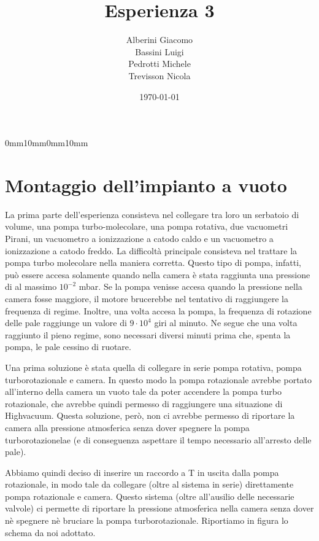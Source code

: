 \documentclass[11pt]{article}
\begin{document}
\title{\textbf{Esperienza 3}}
\author{Alberini Giacomo\\ Bassini Luigi\\Pedrotti Michele\\ Trevisson Nicola}
\date{\today}
\setmarginsrb{30mm}{10mm}{25mm}{10mm}%
             {0mm}{10mm}{0mm}{10mm}
\maketitle

\section{Montaggio dell'impianto a vuoto}
La prima parte dell'esperienza consisteva nel collegare tra loro un serbatoio di volume, una pompa turbo-molecolare, una pompa rotativa, due vacuometri Pirani, un vacuometro a ionizzazione a catodo caldo e un vacuometro a ionizzazione a catodo freddo. La difficoltà principale consisteva nel trattare la pompa turbo molecolare nella maniera corretta. Questo tipo di pompa, infatti, può essere accesa solamente quando nella camera è stata raggiunta una pressione di al massimo $10^{-2}$ \unit{mbar}. Se la pompa venisse accesa quando la pressione nella camera fosse maggiore, il motore brucerebbe nel tentativo di raggiungere la frequenza di regime. Inoltre, una volta accesa la pompa, la frequenza di rotazione delle pale raggiunge un valore di $9\cdot10^{4}$ giri al minuto. Ne segue che una volta raggiunto il pieno regime, sono necessari diversi minuti prima che, spenta la pompa, le pale cessino di ruotare. 
\par Una prima soluzione è stata quella di collegare in serie pompa rotativa, pompa turborotazionale e camera. In questo modo la pompa rotazionale avrebbe portato all'interno della camera un vuoto tale da poter accendere la pompa turbo rotazionale, che avrebbe quindi permesso di raggiungere una situazione di Highvacuum. Questa soluzione, però, non ci avrebbe permesso di riportare la camera alla pressione atmosferica senza dover spegnere la pompa turborotazionelae (e di conseguenza aspettare il tempo necessario all'arresto delle pale).
\par Abbiamo quindi deciso di inserire un raccordo a T in uscita dalla pompa rotazionale, in modo tale da collegare (oltre al sistema in serie) direttamente pompa rotazionale e camera. Questo sistema (oltre all'ausilio delle necessarie valvole) ci permette di riportare la pressione atmosferica nella camera senza dover nè spegnere nè bruciare la pompa turborotazionale. Riportiamo in figura lo schema da noi adottato. 
\end{document}
